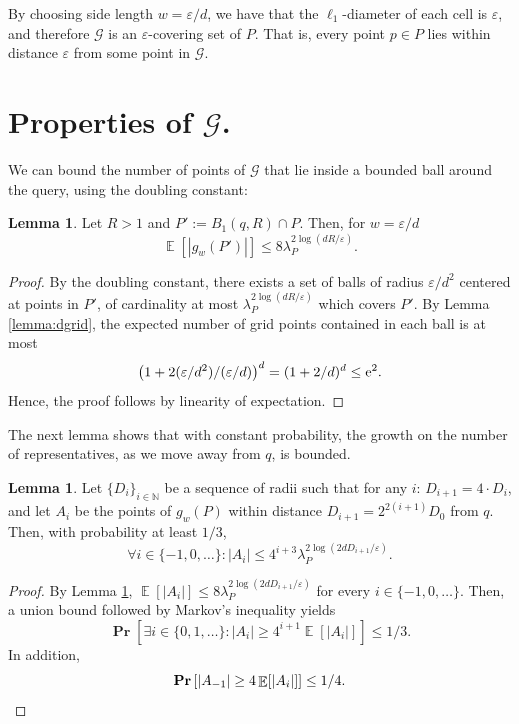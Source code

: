 \documentclass[10pt,a4paper,twoside]{book}
\newcommand{\ex}{{\rm e}}
\newcommand{\eps}{\varepsilon}
\newcommand{\grid}{\mathcal{G}}
\DeclareMathOperator*{\prob}{\mathbf{Pr}}
\DeclareMathOperator*{\EE}{\mathbb{E}}
\theoremstyle{definition}
\newtheorem{lemma}[definition]{Lemma}
\theoremstyle{remark}
\begin{document}
By choosing side length $w= \eps /d$, we have that the $\ell_1$-diameter of each cell is $\eps$, and therefore $\grid$ is an $\eps$-covering set of $P$. That is, every point $p \in P$ lies within distance $\eps$ from some point in $\grid$. 

\section*{Properties of $\grid$.} 
We can bound the number of points of $\grid$ that lie inside a bounded ball around the query, using the doubling constant:
\begin{lemma} \label{lemma:grid1}
Let $R>1$ and $P' := B_1(q,R) \cap P$. Then, for $w=\eps/d$
\[ \EE \left[|g_{w}(P')|\right] \leq 8 \lambda_P^{2\log (dR/\eps)}. \] 
\end{lemma}
\begin{proof}
By the doubling constant, there exists a set of balls of radius $\eps/d^2$ centered at points in $P'$, of cardinality at most $\lambda_P^{2\log (d R/\eps)}$ which covers $P'$. By Lemma \ref{lemma:dgrid}, the expected number of grid points contained in each ball is at most
\[\big(1+2(\eps/ d^2)/ (\eps /d) \big)^d = (1+2/d)^d \leq \ex^2.\] 
Hence, the proof follows by linearity of expectation.
\end{proof}

The next lemma shows that with constant probability, the growth on the number of representatives, as we move away from $q$, is bounded. 

\begin{lemma} \label{lemma:grid2}
Let $\{D_i\}_{i \in \mathbb{N}}$ be a sequence of radii such that for any $i$: $D_{i+1}=4 \cdot D_i$, and let $A_i$ be the points of $g_w(P)$ within distance $D_{i+1} = 2^{2(i+1)} D_0$ from $q$. Then, with probability at least $1/3$,
\[
\forall i\in \{-1,0,\ldots\}: |A_i| \leq 4^{i+3} \lambda_P^{2\log (2d D_{i+1}/\eps)}.
\]
\end{lemma}

\begin{proof}
By Lemma \ref{lemma:grid1}, $\EE[ |A_i|] \leq 8 \lambda_P^{2\log (2d D_{i+1}/\eps)}$ for every $i\in \{-1,0,\ldots\}$. Then, a union bound followed by Markov's inequality yields
\begin{equation*}
    \prob \left[ \exists i \in \{0,1,\ldots\} : |A_i| \geq {4^{i+1}} \EE[ |A_i|] \right] \leq  1/3.
\end{equation*}
In addition,
\begin{equation*}
    \prob \left[  |A_{-1}| \geq 4 \EE[ |A_i|] \right] \leq  1/4. \qedhere
\end{equation*}
\end{proof}
\end{document}
